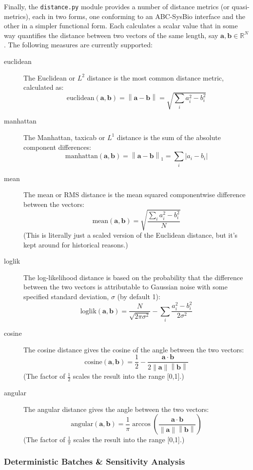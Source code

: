\documentclass[a4paper,11pt]{article}
\newcommand{\vv}[1]{\mathbf{#1}}
\begin{document}
Finally, the \texttt{distance.py} module provides a number of distance metrics (or quasi-metrics), each in two forms, one conforming to an ABC-SysBio interface and the other in a simpler functional form. Each calculates a scalar value that in some way quantifies the distance between two vectors of the same length, say $\vv{a}, \vv{b} \in \mathbb{R}^N$. The following measures are currently supported:
\begin{adjustwidth}{0.8cm}{0.8cm}
\begin{description}
\item[euclidean] The Euclidean or $L^2$ distance is the most common distance metric, calculated as:
$$\text{euclidean}(\vv{a}, \vv{b}) = \left\| \vv{a} - \vv{b} \right\| = \sqrt{\sum_i a_i^2 - b_i^2}$$
\item[manhattan] The Manhattan, taxicab or $L^1$ distance is the sum of the absolute component differences:
$$\text{manhattan}(\vv{a}, \vv{b}) = \left\| \vv{a} - \vv{b} \right\|_1 = \sum_i \left| a_i - b_i \right| $$
\item[mean] The mean or RMS distance is the mean squared componentwise difference between the vectors:
$$\text{mean}(\vv{a}, \vv{b}) = \sqrt{\frac{\sum_i a_i^2 - b_i^2}{N}}$$
(This is literally just a scaled version of the Euclidean distance, but it's kept around for historical reasons.)
\item[loglik] The log-likelihood distance is based on the probability that the difference between the two vectors is attributable to Gaussian noise with some specified standard deviation, $\sigma$ (by default 1):
$$\text{loglik}(\vv{a}, \vv{b}) = \frac{N}{\sqrt{2\pi\sigma^2}} - \sum_i \frac{a_i^2 - b_i^2}{2\sigma^2}$$
\item[cosine] The cosine distance gives the cosine of the angle between the two vectors:
$$\text{cosine}(\vv{a}, \vv{b}) = \frac{1}{2} - \frac{\vv{a} \cdot \vv{b}}{2 \left\| \vv{a} \right\| \left\| \vv{b} \right\|}$$
(The factor of $\frac{1}{2}$ scales the result into the range {[0,1]}.)
\item[angular] The angular distance gives the angle between the two vectors:
$$\text{angular}(\vv{a}, \vv{b}) = \frac{1}{\pi} \arccos \left( \frac{\vv{a} \cdot \vv{b}}{\left\| \vv{a} \right\| \left\| \vv{b} \right\|} \right)$$
(The factor of $\frac{1}{\pi}$ scales the result into the range {[0,1]}.)
\end{description}
\end{adjustwidth}

\subsubsection{Deterministic Batches \& Sensitivity Analysis}\label{batch:dsim}
\end{document}
